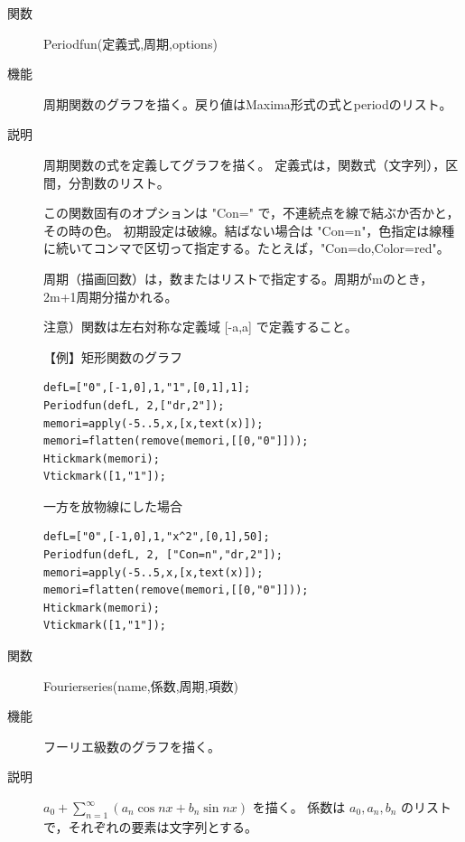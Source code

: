 \documentclass[papersize,a4paper,10pt,uplatex]{jsarticle}
\begin{document}
\begin{description}
\vspace{\baselineskip}
\begin{center}\scalebox{0.7}{}\end{center}

\vspace{\baselineskip}
\hypertarget{periodfun}{}
\item[関数]Periodfun(定義式,周期,options)
\item[機能]周期関数のグラフを描く。戻り値はMaxima形式の式とperiodのリスト。
\item[説明]周期関数の式を定義してグラフを描く。
定義式は，関数式（文字列），区間，分割数のリスト。

この関数固有のオプションは "Con=" で，不連続点を線で結ぶか否かと，その時の色。
 初期設定は破線。結ばない場合は "Con=n"，色指定は線種に続いてコンマで区切って指定する。たとえば，"Con=do,Color=red"。

周期（描画回数）は，数またはリストで指定する。周期がmのとき，2m+1周期分描かれる。


注意）関数は左右対称な定義域 [-a,a] で定義すること。

\vspace{\baselineskip}
【例】矩形関数のグラフ

\begin{verbatim}
defL=["0",[-1,0],1,"1",[0,1],1];
Periodfun(defL, 2,["dr,2"]);
memori=apply(-5..5,x,[x,text(x)]);
memori=flatten(remove(memori,[[0,"0"]]));
Htickmark(memori);
Vtickmark([1,"1"]);
\end{verbatim}

\hspace{20mm}

\vspace{\baselineskip}
一方を放物線にした場合
\begin{verbatim}
defL=["0",[-1,0],1,"x^2",[0,1],50];
Periodfun(defL, 2, ["Con=n","dr,2"]);
memori=apply(-5..5,x,[x,text(x)]);
memori=flatten(remove(memori,[[0,"0"]]));
Htickmark(memori);
Vtickmark([1,"1"]);
\end{verbatim}

\hspace{20mm}

\vspace{\baselineskip}
\hypertarget{fourierseries}{}
\item[関数]Fourierseries(name,係数,周期,項数)
\item[機能]フーリエ級数のグラフを描く。
\item[説明]$a_0+\displaystyle{\sum _{n=1} ^{\infty}(a_n \cos nx + b_n \sin nx)}$ を描く。
係数は $a_0,a_n,b_n$ のリストで，それぞれの要素は文字列とする。


\end{description}
\end{document}
